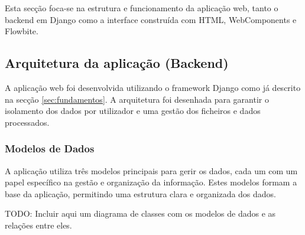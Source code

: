 Esta secção foca-se na estrutura e funcionamento da aplicação web, tanto o backend em Django como a interface construída com HTML, WebComponents e Flowbite.

\subsection{Arquitetura da aplicação (Backend)}

A aplicação web foi desenvolvida utilizando o framework Django como já descrito na secção \ref{sec:fundamentos}. A arquitetura foi desenhada para garantir o isolamento dos dados por utilizador e uma gestão dos ficheiros e dados processados.

\subsubsection{Modelos de Dados}

A aplicação utiliza três modelos principais para gerir os dados, cada um com um papel específico na gestão e organização da informação. Estes modelos formam a base da aplicação, permitindo uma estrutura clara e organizada dos dados.

TODO: Incluir aqui um diagrama de classes com os modelos de dados e as relações entre eles.

